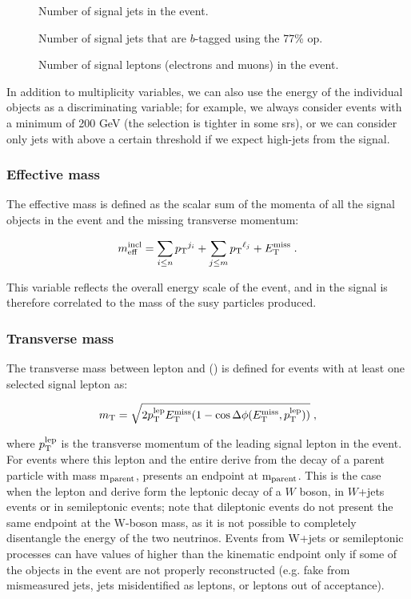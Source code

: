 \begin{description}
\item[\njet] Number of signal jets in the event.
\item[\nbjet] Number of signal jets that are $b$-tagged using the 77\% \gls{op}.
\item[\nlep] Number of signal leptons (electrons and muons) in the event.
\end{description}

\noindent In addition to multiplicity variables, we can also use the energy of the individual objects as a discriminating variable; 
for example, we always consider events with a minimum \met of 200 GeV (the selection is tighter in some \glspl{sr}), 
or we can consider only jets with \pt above a certain threshold if we expect high-\pt jets from the signal. 

\subsubsection*{Effective mass}

The effective mass is defined as the scalar sum of the momenta of all the signal objects in the event and the missing transverse momentum:

\begin{equation}
m_{\mathrm{eff}}^{\mathrm{incl}} = \sum_{i\leq n} {p_{\rm T}}^{j_i}  + \sum_{j\leq m} {p_{\rm T}}^{\ell_j}  + E_{\rm T}^{\mathrm{miss}} \; .
\end{equation}

\noindent This variable reflects the overall energy scale of the event, and in the signal is therefore correlated to the mass of the \gls{susy} particles produced. 

\subsubsection*{Transverse mass}

The transverse mass between lepton and \met (\mt) is defined for events with at least one selected signal lepton as: 

\begin{equation}
m_\mathrm{T} = \sqrt{2p_{\rm T}^{\rm{lep}}E_{\rm T}^{\mathrm{miss}}(1-\cos\Delta\phi(E_{\rm T}^{\mathrm{miss}},p_{\rm T}^{\rm{lep}}))} \; ,
\end{equation}

\noindent where $p_{\rm T}^{\rm{lep}}$ is the transverse momentum of the leading signal lepton in the event. 
For events where this lepton and the entire \met derive from the decay of a parent particle with mass m$_{\rm{parent}}$, \mt presents an endpoint at m$_{\rm{parent}}$. 
This is the case when the lepton and \met derive form the leptonic decay of a $W$ boson, in $W$+jets events or in semileptonic \ttbar events; 
note that dileptonic \ttbar events do not present the same endpoint at the W-boson mass, as it is not possible to completely disentangle the energy of the two neutrinos. Events from W+jets or semileptonic \ttbar processes can have values of \mt higher than the kinematic endpoint only if some of the objects in the event are not properly reconstructed (e.g. fake \met from mismeasured jets, jets misidentified as leptons, or leptons out of acceptance).

